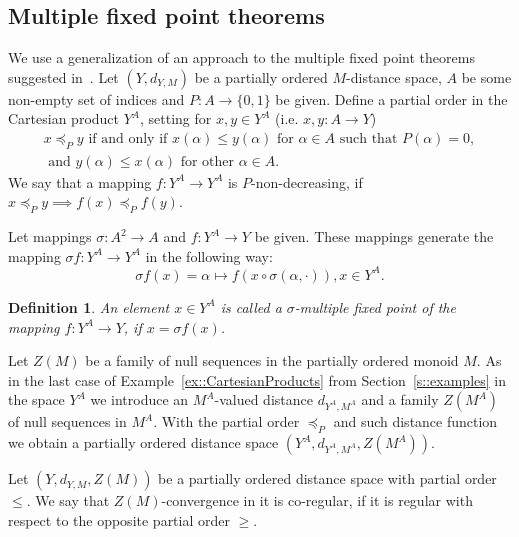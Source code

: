 \documentclass[12pt]{amsart}          %
\newtheorem{definition}{Definition}
\begin{document}
 \subsection{Multiple fixed point theorems}
 We use a generalization of an approach to the multiple fixed point theorems suggested in~\cite{ChobanBerinde}.
Let $(Y,d_{Y,M})$ be a partially ordered $M$-distance space, $A$ be some non-empty set of indices and $P\colon A\to  \{0,1\}$ be given. Define a partial order in the Cartesian product  $Y^A$, setting for $x, y\in Y^A$ (i.e. $x,y\colon A\to Y$)
\begin{multline*}
x\preccurlyeq_{P} y \text{ if and only if }  x(\alpha)\le y(\alpha) \text{ for } \alpha\in A \text{ such that } P(\alpha) = 0, 
\\
\text{ and } y(\alpha)\le x(\alpha)\text{ for other } \alpha\in A.
\end{multline*} 
We say that a mapping $f\colon Y^A\to Y^A$ is $P$-non-decreasing, if
$
x\preccurlyeq_{P} y\implies f(x)\preccurlyeq_{P} f(y).
$

Let mappings
$\sigma\colon A^2\to A$
 and $f\colon Y^A\to Y$  be given. These mappings generate the mapping
$\sigma f\colon Y^A\to Y^A$
in the following way:
$$\sigma f(x)=\alpha\mapsto f(x\circ \sigma(\alpha, \cdot)), x\in Y^A.$$

\begin{definition}
An element $x\in Y^A$ is called a $\sigma$-multiple fixed point of the mapping $f\colon Y^A\to Y$, if $x= \sigma f(x)$.
\end{definition}

Let $Z(M)$ be a family of null sequences in the partially ordered monoid $M$. As in the last case of Example~\ref{ex::CartesianProducts} from Section~\ref{s::examples} in the space $Y^A$ we introduce an $M^A$-valued distance $d_{Y^A, M^A}$ and a family $Z(M^A)$ of null sequences in $M^A$.
With the partial order $\preccurlyeq_P$ and such distance function we obtain a partially ordered distance space $(Y^A, d_{Y^A,M^A},Z(M^A))$.

 Let $(Y,d_{Y,M}, Z(M))$ be a partially ordered distance space with partial order $\leq$. We say that $Z(M)$-convergence in it is co-regular, if it is regular with respect to the opposite partial order $\geq$.
\end{document}
